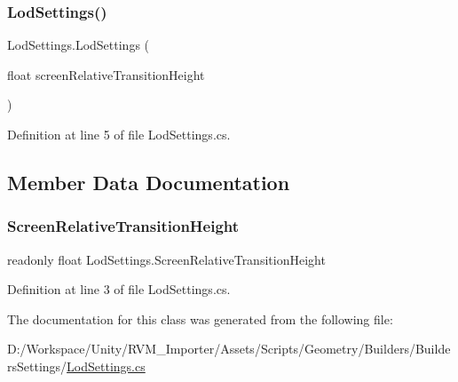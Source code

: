 \subsubsection{\texorpdfstring{LodSettings()}{LodSettings()}}
{\footnotesize\ttfamily Lod\+Settings.\+Lod\+Settings (\begin{DoxyParamCaption}\item[{float}]{screen\+Relative\+Transition\+Height }\end{DoxyParamCaption})}



Definition at line 5 of file Lod\+Settings.\+cs.



\subsection{Member Data Documentation}
\mbox{\label{class_lod_settings_a38ac54ce2be38e74cdc4c66ca8541145}} 
\subsubsection{\texorpdfstring{ScreenRelativeTransitionHeight}{ScreenRelativeTransitionHeight}}
{\footnotesize\ttfamily readonly float Lod\+Settings.\+Screen\+Relative\+Transition\+Height}



Definition at line 3 of file Lod\+Settings.\+cs.



The documentation for this class was generated from the following file\+:\begin{DoxyCompactItemize}
\item 
D\+:/\+Workspace/\+Unity/\+R\+V\+M\+\_\+\+Importer/\+Assets/\+Scripts/\+Geometry/\+Builders/\+Builders\+Settings/\mbox{\hyperlink{_lod_settings_8cs}{Lod\+Settings.\+cs}}\end{DoxyCompactItemize}
